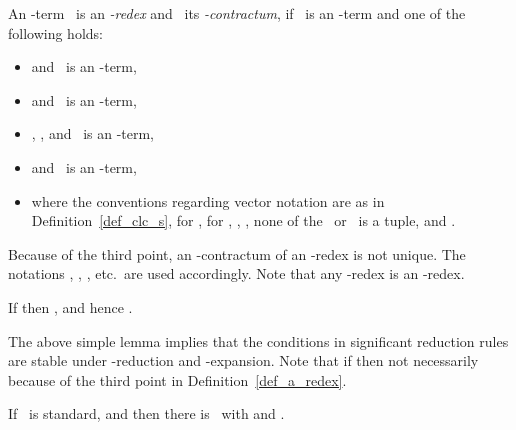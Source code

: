 \documentclass[a4paper,UKenglish]{lipics-v2016}
\begin{document}
\begin{definition}\label{def_a_redex}
  An -term~ is an \emph{-redex} and~ its
  \emph{-contractum}, if~ is an -term and one of the
  following holds:
  \begin{itemize}
  \item  and~ is an -term,
  \item  and~ is an -term,
  \item , ,  and~ is an -term,
  \item  and~ is an -term,
  \item  where the conventions regarding
    vector notation are as in Definition~\ref{def_clc_s},  for ,  for ,
    , , none of the~
    or~ is a tuple, and .
  \end{itemize}
  Because of the third point, an -contractum of an -redex is not
  unique. The notations , , , etc.~are
  used accordingly. Note that any -redex is an -redex.
\end{definition}

\begin{lemma}\label{lem_a_to_erased_equiv}
  If  then , and
  hence .
\end{lemma}

The above simple lemma implies that the conditions in significant
reduction rules are stable under -reduction and -expansion. Note
that if  then not necessarily  because of the
third point in Definition~\ref{def_a_redex}.

\begin{lemma}\label{lem_erase_expand}
  If~ is standard,  and
   then there is~ with
   and .
\end{lemma}
\end{document}
